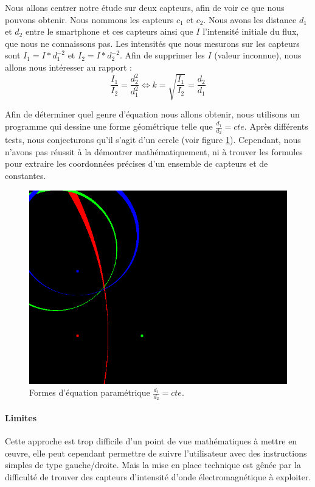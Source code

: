 \documentclass{article}
\begin{document}
Nous allons centrer notre étude sur deux capteurs, afin de voir ce que nous pouvons obtenir. Nous nommons les capteurs $c_1$ et $c_2$. Nous avons les distance $d_1$ et $d_2$ entre le smartphone et ces capteurs ainsi que $I$ l'intensité initiale du flux, que nous ne connaissons pas. Les intensités que nous mesurons sur les capteurs sont $I_1=I*d_1^{-2}$ et $I_2=I*d_2^{-2}$. Afin de supprimer les $I$ (valeur inconnue), nous allons nous intéresser au rapport :
\[ \frac{I_1}{I_2} = \frac{d_2^2}{d_1^2} \Leftrightarrow k=\sqrt{\frac{I_1}{I_2}}=\frac{d_2}{d_1} \]

Afin de déterminer quel genre d'équation nous allons obtenir, nous utilisons un programme qui dessine une forme géométrique telle que $\frac{d_1}{d_2} = cte$. Après différents tests, nous conjecturons qu'il s'agit d'un cercle (voir figure \ref{circle}). Cependant, nous n'avons pas réussit à la démontrer mathématiquement, ni à trouver les formules pour extraire les coordonnées précises d'un ensemble de capteurs et de constantes.

\begin{figure}
    \begin{center}
        \includegraphics[width=0.75\linewidth]{rcs/circle.png}
    \end{center}
    \caption{Formes d'équation paramétrique $\frac{d_1}{d_2}=cte$.}
    \label{circle}
\end{figure}

\paragraph{Limites} Cette approche est trop difficile d'un point de vue mathématiques à mettre en œuvre, elle peut cependant permettre de suivre l'utilisateur avec des instructions simples de type gauche/droite. Mais la mise en place technique est gênée par la difficulté de trouver des capteurs d'intensité d'onde électromagnétique à exploiter.
\end{document}
